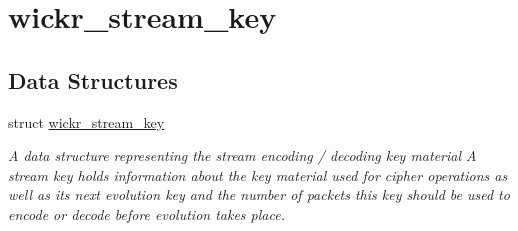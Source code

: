 \hypertarget{group__wickr__stream__key}{}\section{wickr\+\_\+stream\+\_\+key}
\label{group__wickr__stream__key}
\subsection*{Data Structures}
\begin{DoxyCompactItemize}
\item 
struct \hyperlink{structwickr__stream__key}{wickr\+\_\+stream\+\_\+key}
\begin{DoxyCompactList}\small\item\em A data structure representing the stream encoding / decoding key material A stream key holds information about the key material used for cipher operations as well as it\textquotesingle{}s next evolution key and the number of packets this key should be used to encode or decode before evolution takes place. \end{DoxyCompactList}\end{DoxyCompactItemize}
